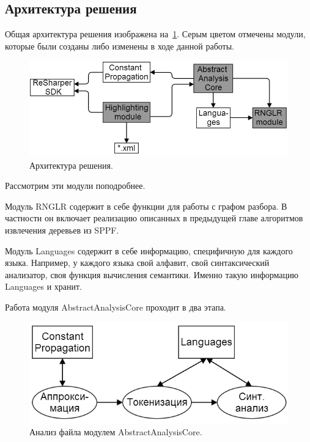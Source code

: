 \subsection{Архитектура решения}

Общая архитектура решения изображена на~\ref{architecture}. Серым цветом отмечены модули, которые были созданы либо изменены в ходе данной работы.

\begin{figure}[t]
\centering
\includegraphics[width=\linewidth]{Ivanov/Pictures/architecture.png}
\caption{Архитектура решения.}
\label{architecture}
\end{figure}

Рассмотрим эти модули поподробнее. 

Модуль RNGLR содержит в себе функции для работы с графом разбора. В частности он включает реализацию описанных в предыдущей главе алгоритмов извлечения деревьев из SPPF. 

Модуль Languages содержит в себе информацию, специфичную для каждого языка. Например, у каждого языка свой алфавит, свой синтаксический анализатор, своя функция вычисления семантики. Именно такую информацию Languages и хранит. 

Работа модуля AbstractAnalysisCore проходит в два этапа. 

\begin{figure}[t]
\centering
\includegraphics[width=\linewidth]{Ivanov/Pictures/Core.png}
\caption{Анализ файла модулем AbstractAnalysisCore.}
\label{core}
\end{figure}

